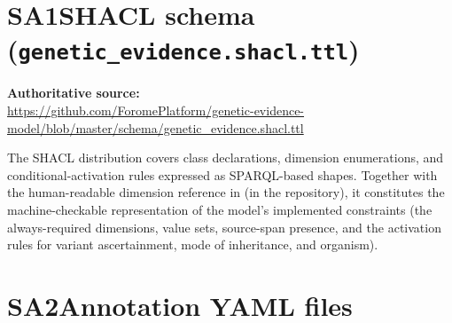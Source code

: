 %
%
%

\section*{SA1\quad SHACL schema (\texttt{genetic\_evidence.shacl.ttl})}

\noindent\textbf{Authoritative source:}\\
\url{https://github.com/ForomePlatform/genetic-evidence-model/blob/master/schema/genetic_evidence.shacl.ttl}

\medskip
\noindent The SHACL distribution covers class declarations, dimension
enumerations, and conditional-activation rules expressed as
SPARQL-based shapes. Together with the human-readable dimension
reference in  (in the repository), it
constitutes the machine-checkable representation of the model's
implemented constraints (the always-required dimensions, value sets,
source-span presence, and the activation rules for variant
ascertainment, mode of inheritance, and organism).



\section*{SA2\quad Annotation YAML files}

